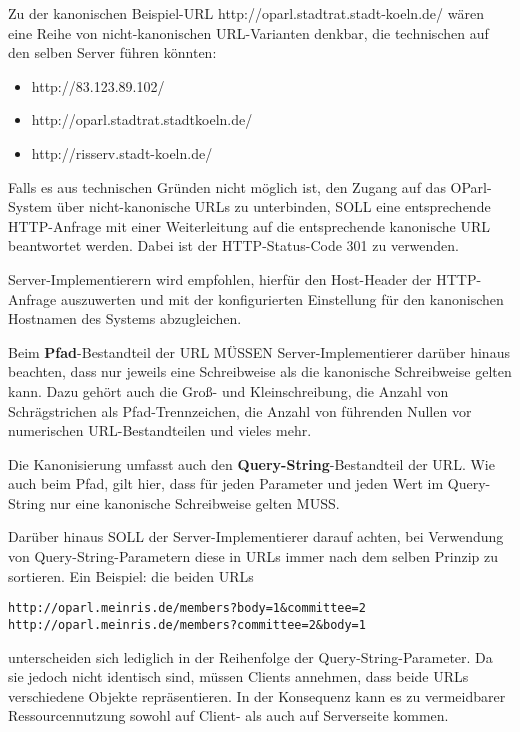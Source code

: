\documentclass[,a4paper]{article}
\begin{document}
Zu der kanonischen Beispiel-URL http://oparl.stadtrat.stadt-koeln.de/
wären eine Reihe von nicht-kanonischen URL-Varianten denkbar, die
technischen auf den selben Server führen könnten:

\begin{itemize}
\itemsep1pt\parskip0pt
\item
  http://83.123.89.102/
\item
  http://oparl.stadtrat.stadtkoeln.de/
\item
  http://risserv.stadt-koeln.de/
\end{itemize}

Falls es aus technischen Gründen nicht möglich ist, den Zugang auf das
OParl-System über nicht-kanonische URLs zu unterbinden, SOLL eine
entsprechende HTTP-Anfrage mit einer Weiterleitung auf die entsprechende
kanonische URL beantwortet werden. Dabei ist der HTTP-Status-Code 301 zu
verwenden.

Server-Implementierern wird empfohlen, hierfür den Host-Header der
HTTP-Anfrage auszuwerten und mit der konfigurierten Einstellung für den
kanonischen Hostnamen des Systems abzugleichen.

Beim \textbf{Pfad}-Bestandteil der URL MÜSSEN Server-Implementierer
darüber hinaus beachten, dass nur jeweils eine Schreibweise als die
kanonische Schreibweise gelten kann. Dazu gehört auch die Groß- und
Kleinschreibung, die Anzahl von Schrägstrichen als Pfad-Trennzeichen,
die Anzahl von führenden Nullen vor numerischen URL-Bestandteilen und
vieles mehr.

Die Kanonisierung umfasst auch den \textbf{Query-String}-Bestandteil der
URL. Wie auch beim Pfad, gilt hier, dass für jeden Parameter und jeden
Wert im Query-String nur eine kanonische Schreibweise gelten MUSS.

Darüber hinaus SOLL der Server-Implementierer darauf achten, bei
Verwendung von Query-String-Parametern diese in URLs immer nach dem
selben Prinzip zu sortieren. Ein Beispiel: die beiden URLs

\begin{verbatim}
http://oparl.meinris.de/members?body=1&committee=2
http://oparl.meinris.de/members?committee=2&body=1
\end{verbatim}

unterscheiden sich lediglich in der Reihenfolge der
Query-String-Parameter. Da sie jedoch nicht identisch sind, müssen
Clients annehmen, dass beide URLs verschiedene Objekte repräsentieren.
In der Konsequenz kann es zu vermeidbarer Ressourcennutzung sowohl auf
Client- als auch auf Serverseite kommen.
\end{document}
